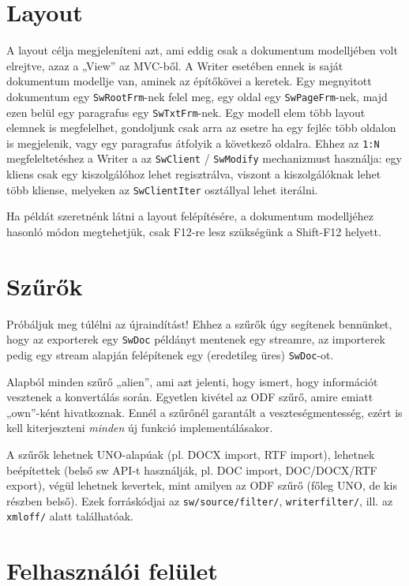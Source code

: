 \documentclass[a4paper]{report}
\begin{document}
\section{Layout}

A layout célja megjeleníteni azt, ami eddig csak a dokumentum modelljében volt
elrejtve, azaz a „View” az MVC-ből. A Writer esetében ennek is saját dokumentum
modellje van, aminek az építőkövei a keretek. Egy megnyitott dokumentum egy
\texttt{SwRootFrm}-nek felel meg, egy oldal egy \texttt{SwPageFrm}-nek, majd
ezen belül egy paragrafus egy \texttt{SwTxtFrm}-nek. Egy modell elem több
layout elemnek is megfelelhet, gondoljunk csak arra az esetre ha egy fejléc
több oldalon is megjelenik, vagy egy paragrafus átfolyik a következő oldalra.
Ehhez az \texttt{1:N} megfeleltetéshez a Writer a az \texttt{SwClient} /
\texttt{SwModify} mechanizmust használja: egy kliens csak egy kiszolgálóhoz
lehet regisztrálva, viszont a kiszolgálóknak lehet több kliense, melyeken az
\texttt{SwClientIter} osztállyal lehet iterálni.

Ha példát szeretnénk látni a layout felépítésére, a dokumentum modelljéhez
hasonló módon megtehetjük, csak F12-re lesz szükségünk a Shift-F12 helyett.

\section{Szűrők}

Próbáljuk meg túlélni az újraindítást! Ehhez a szűrők úgy segítenek bennünket,
hogy az exporterek egy \texttt{SwDoc} példányt mentenek egy streamre, az
importerek pedig egy stream alapján felépítenek egy (eredetileg üres)
\texttt{SwDoc}-ot.

Alapból minden szűrő „alien”, ami azt jelenti, hogy ismert, hogy információt
vesztenek a konvertálás során. Egyetlen kivétel az ODF szűrő, amire emiatt
„own”-ként hivatkoznak. Ennél a szűrőnél garantált a veszteségmentesség, ezért
is kell kiterjeszteni \emph{minden} új funkció implementálásakor.

A szűrők lehetnek UNO-alapúak (pl. DOCX import, RTF import), lehetnek
beépítettek (belső sw API-t használják, pl. DOC import, DOC/DOCX/RTF
export), végül lehetnek kevertek, mint amilyen az ODF szűrő (főleg UNO, de kis
részben belső). Ezek forráskódjai az \texttt{sw/source/filter/},
\texttt{writerfilter/}, ill. az \texttt{xmloff/} alatt találhatóak.

\section{Felhasználói felület}
\end{document}
